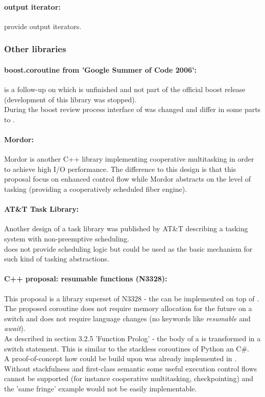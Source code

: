 \paragraph*{output iterator:}
 provide output iterators.


\subsubsection*{Other libraries}
\paragraph*{boost.coroutine from 'Google Summer of Code 2006':}
\boostcoroutine is a follow-up on \boostcorosum which is unfinished and
not part of the official boost release (development of this library was
stopped).\\
During the boost review process interface of \boostcoroutine was changed and
differ in some parts to \boostcorosum.

\paragraph*{Mordor:}
Mordor\cite{mordor} is another C++ library implementing cooperative multitasking
in order to achieve high I/O performance. The difference to this design is that
this proposal focus on enhanced control flow while Mordor\cite{mordor} abstracts
on the level of tasking (providing a cooperatively scheduled fiber engine).

\paragraph*{AT\&T Task Library:}
Another design of a task library was published by AT\&T\cite{atnt1989} describing
a tasking system with non-preemptive scheduling.\\
\coro does not provide scheduling logic but could be used as the basic mechanism
for such kind of tasking abstractions.

\paragraph*{C++ proposal: resumable functions (N3328\cite{n3328}):}
This proposal is a library superset of N3328 - the \resumfn can be implemented
on top of \coro. The proposed coroutine does not require memory allocation for
the future on a switch and does not require language changes (no keywords like
\textit{resumable} and \textit{await}).\\
As described in section 3.2.5 'Function Prolog' - the body of a \resumfn is
transformed in a switch statement. This is similar to the stackless coroutines
of Python an C\#.\\
A proof-of-concept how \await could be build upon \boostcoroutine was already
implemented in \awaitemu.\\
\newline
Without stackfulness and first-class semantic some useful execution control
flows cannot be supported (for instance cooperative multitasking,
checkpointing) and the 'same fringe' example would not be easily implementable.

